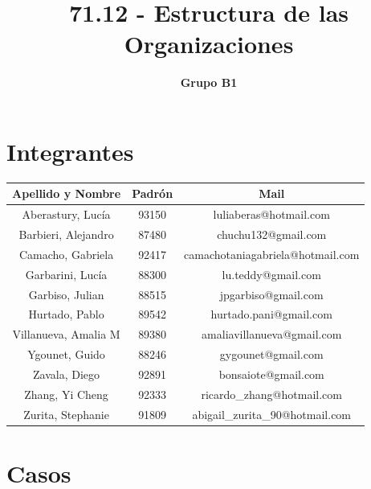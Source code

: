 \documentclass[a4paper,10pt,titlepage]{article}
\title{71.12 - Estructura de las Organizaciones}
\author{\textbf{Grupo B1}}
\begin{document}
\pagestyle{fancy}
\maketitle

\tableofcontents
\newpage


\section{Integrantes}
\begin{center}
  \begin{tabular}{ | c | c | c | }
    \hline 
      \textbf{Apellido y Nombre} & \textbf{Padr\'on} & \textbf{Mail} \\ \hline
      Aberastury, Luc\'ia & 93150 & luliaberas@hotmail.com \\ \hline
      Barbieri, Alejandro & 87480 & chuchu132@gmail.com \\ \hline
      Camacho, Gabriela & 92417 & camachotaniagabriela@hotmail.com  \\ \hline
      Garbarini, Luc\'ia & 88300 & lu.teddy@gmail.com \\ \hline
      Garbiso, Julian & 88515 & jpgarbiso@gmail.com \\ \hline
      Hurtado, Pablo & 89542 & hurtado.pani@gmail.com \\ \hline
      Villanueva, Amalia M & 89380 & amaliavillanueva@gmail.com \\ \hline
      Ygounet, Guido & 88246 & gygounet@gmail.com \\ \hline
      Zavala, Diego & 92891 & bonsaiote@gmail.com  \\ \hline
      Zhang, Yi Cheng & 92333 & ricardo\_zhang@hotmail.com \\ \hline
      Zurita, Stephanie & 91809 & abigail\_zurita\_90@hotmail.com \\
    \hline
  \end{tabular}
\end{center}

\newpage
\section{Casos}
\end{document}
